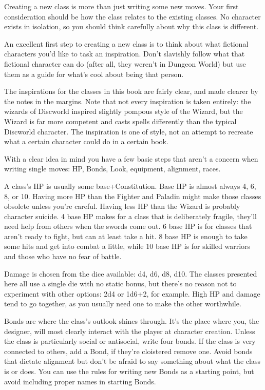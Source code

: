 Creating a new class is more than just writing some new moves. Your first consideration should be how the class relates to the existing classes. No character exists in isolation, so you should think carefully about why this class is different.

       

An excellent first step to creating a new class is to think about what fictional characters you'd like to task an inspiration. Don't slavishly follow what that fictional character can do (after all, they weren't in Dungeon World) but use them as a guide for what's cool about being that person.

       

The inspirations for the classes in this book are fairly clear, and made clearer by the notes in the margins. Note that not every inspiration is taken entirely: the wizards of Discworld inspired slightly pompous style of the Wizard, but the Wizard is far more competent and casts spells differently than the typical Discworld character. The inspiration is one of style, not an attempt to recreate what a certain character could do in a certain book.

       

With a clear idea in mind you have a few basic steps that aren't a concern when writing single moves: HP, Bonds, Look, equipment, alignment, races.

       

A class's HP is usually some base+Constitution. Base HP is almost always 4, 6, 8, or 10. Having more HP than the Fighter and Paladin might make those classes obsolete unless you're careful. Having less HP than the Wizard is probably character suicide. 4 base HP makes for a class that is deliberately fragile, they'll need help from others when the swords come out. 6 base HP is for classes that aren't ready to fight, but can at least take a hit. 8 base HP is enough to take some hits and get into combat a little, while 10 base HP is for skilled warriors and those who have no fear of battle.

       

Damage is chosen from the dice available: d4, d6, d8, d10. The classes presented here all use a single die with no static bonus, but there's no reason not to experiment with other options: 2d4 or 1d6+2, for example. High HP and damage tend to go together, as you usually need one to make the other worthwhile.

       

Bonds are where the class's outlook shines through. It's the place where you, the designer, will most clearly interact with the player at character creation. Unless the class is particularly social or antisocial, write four bonds. If the class is very connected to others, add a Bond, if they're cloistered remove one. Avoid bonds that dictate alignment but don't be afraid to say something about what the class is or does. You can use the rules for writing new Bonds as a starting point, but avoid including proper names in starting Bonds.

